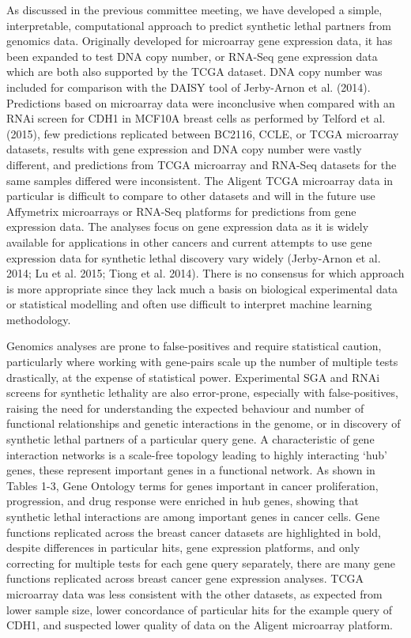 As discussed in the previous committee meeting, we have developed a simple, interpretable, computational approach to predict synthetic lethal partners from genomics data.  Originally developed for microarray gene expression data, it has been expanded to test DNA copy number, or RNA-Seq gene expression data which are both also supported by the TCGA dataset.  DNA copy number was included for comparison with the DAISY tool of Jerby-Arnon et al. (2014).  Predictions based on microarray data were inconclusive when compared with an RNAi screen for CDH1 in MCF10A breast cells as performed by Telford et al. (2015), few predictions replicated between BC2116, CCLE, or TCGA microarray datasets, results with gene expression and DNA copy number were vastly different, and predictions from TCGA microarray and RNA-Seq datasets for the same samples differed were inconsistent.  The Aligent TCGA microarray data in particular is difficult to compare to other datasets and will in the future use Affymetrix microarrays or RNA-Seq platforms for predictions from gene expression data.  The analyses focus on gene expression data as it is widely available for applications in other cancers and current attempts to use gene expression data for synthetic lethal discovery vary widely (Jerby-Arnon et al. 2014; Lu et al. 2015; Tiong et al. 2014).  There is no consensus for which approach is more appropriate since they lack much a basis on biological experimental data or statistical modelling and often use difficult to interpret machine learning methodology.

Genomics analyses are prone to false-positives and require statistical caution, particularly where working with gene-pairs scale up the number of multiple tests drastically, at the expense of statistical power.  Experimental SGA and RNAi screens for synthetic lethality are also error-prone, especially with false-positives, raising the need for understanding the expected behaviour and number of functional relationships and genetic interactions in the genome, or in discovery of synthetic lethal partners of a particular query gene.  A characteristic of gene interaction networks is a scale-free topology leading to highly interacting ‘hub’ genes, these represent important genes in a functional network.  As shown in Tables 1-3, Gene Ontology terms for genes important in cancer proliferation, progression, and drug response were enriched in hub genes, showing that synthetic lethal interactions are among important genes in cancer cells.  Gene functions replicated across the breast cancer datasets are highlighted in bold, despite differences in particular hits, gene expression platforms, and only correcting for multiple tests for each gene query separately, there are many gene functions replicated across breast cancer gene expression analyses.  TCGA microarray data was less consistent with the other datasets, as expected from lower sample size, lower concordance of particular hits for the example query of CDH1, and suspected lower quality of data on the Aligent microarray platform.

